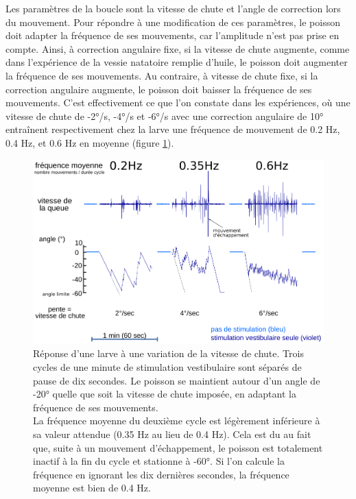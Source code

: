 Les paramètres de la boucle sont la vitesse de chute et l'angle de correction lors du mouvement. Pour répondre à une modification de ces paramètres, le poisson doit adapter la fréquence de ses mouvements, car l'amplitude n'est pas prise en compte. Ainsi, à correction angulaire fixe, si la vitesse de chute augmente, comme dans l'expérience de la vessie natatoire remplie d'huile, le poisson doit augmenter la fréquence de ses mouvements. Au contraire, à vitesse de chute fixe, si la correction angulaire augmente, le poisson doit baisser la fréquence de ses mouvements. C'est effectivement ce que l'on constate dans les expériences, où une vitesse de chute de -2°/s, -4°/s et -6°/s avec une correction angulaire de 10° entraînent respectivement chez la larve une fréquence de mouvement de 0.2 Hz, 0.4 Hz, et 0.6 Hz en moyenne (figure \ref{FIGvariationvitesse}).


\begin{figure}
\centering
\includegraphics[width=\textwidth]{./files/variation-vitesse.svg.png}
\caption{
Réponse d'une larve à une variation de la vitesse de chute. Trois cycles de une minute de stimulation vestibulaire sont séparés de pause de dix secondes. Le poisson se maintient autour d'un angle de -20° quelle que soit la vitesse de chute imposée, en adaptant la fréquence de ses mouvements.
\\La fréquence moyenne du deuxième cycle est légèrement inférieure à sa valeur attendue (0.35 Hz au lieu de 0.4 Hz). Cela est du au fait que, suite à un mouvement d'échappement, le poisson est totalement inactif à la fin du cycle et stationne à -60°. Si l'on calcule la fréquence en ignorant les dix dernières secondes, la fréquence moyenne est bien de 0.4 Hz.
\label{FIGvariationvitesse}}
\end{figure}


